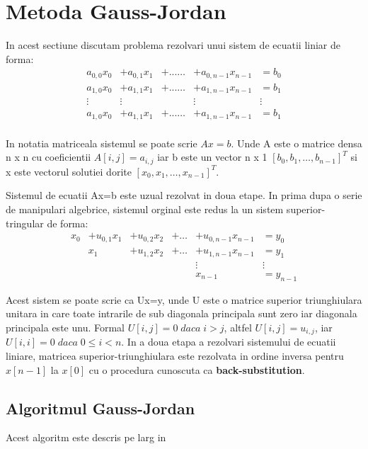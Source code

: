 \chapter{Metoda Gauss-Jordan}

\hspace{5mm}In acest sectiune discutam problema rezolvari unui sistem de
ecuatii liniar de forma:
$$\begin{array}{ccccc}
a_{0,0}x_0&+a_{0,1}x_1&+...\ldots&+a_{0,n-1}x_{n-1}&=b_0\\
a_{1,0}x_0&+a_{1,1}x_1&+...\ldots&+a_{1,n-1}x_{n-1}&=b_1\\
\vdots&\vdots&&\vdots&\vdots\\
a_{1,0}x_0&+a_{1,1}x_1&+...\ldots&+a_{1,n-1}x_{n-1}&=b_1\\
\end{array}$$

In notatia matriceala sistemul se poate scrie $Ax=b$. Unde A este o matrice
densa n x n cu coeficientii $A[i,j]=a_{i,j}$ iar b este un vector n x 1
$[b_0,b_1,\ldots,b_{n-1}]^T$ si x este vectorul solutiei dorite
$[x_0,x_1,\ldots,x_{n-1}]^T$.

Sistemul de ecuatii Ax=b este uzual rezolvat in doua etape. In prima dupa o
serie de manipulari algebrice, sistemul orginal este redus la un sistem
superior-tringular de forma:
$$\begin{array}{cccccc}
x_0&+u_{0,1}x_1&+u_{0,2}x_2&+\ldots&+u_{0,n-1}x_{n-1}&=y_0\\
&x_1&+u_{1,2}x_2&+\ldots&+u_{1,n-1}x_{n-1}&=y_1\\
&&&&\vdots&\vdots\\
&&&&x_{n-1}&=y_{n-1}
\end{array}$$

Acest sistem se poate scrie ca Ux=y, unde U este o matrice superior
triunghiulara unitara in care toate intrarile de sub diagonala principala
sunt zero iar diagonala principala este unu. Formal $U[i,j]=0\; daca\; i>j$,
altfel $U[i,j]=u_{i,j}$, iar $U[i,i]=0\; daca\; 0\le i<n$. In a doua etapa a
rezolvari sistemului de ecuatii liniare, matricea superior-triunghiulara
este rezolvata in ordine inversa pentru $x[n-1]$ la $x[0]$ cu o procedura
cunoscuta ca {\bf back-substitution}.
\pagebreak
\section{Algoritmul Gauss-Jordan}

\hspace{5mm}Acest algoritm este descris pe larg in \cite[178-196]{kumar}
